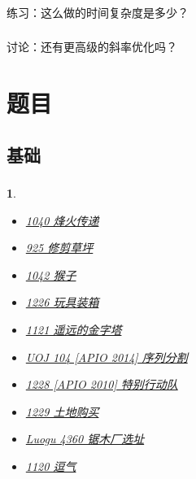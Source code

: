 \documentclass[9pt, UTF8]{beamer} %
\newcommand \fts {\frametitle{\insertsubsection}}
\newtheorem*{bbox}{}
\begin{document}
	\begin{frame}
		\fts

		练习：这么做的时间复杂度是多少？
	\end{frame}

	\begin{frame}
		\fts

		讨论：还有更高级的斜率优化吗？
	\end{frame}

	\section{题目}

	\subsection{基础}

	\begin{frame}
		\fts

		\begin{bbox}
			\begin{itemize}

				\item \href {http://219.153.61.2:9000/problem/1040} {1040 烽火传递}

				\item \href {http://219.153.61.2:9000/problem/925} {925 修剪草坪}

				\item \href {http://219.153.61.2:9000/problem/1042} {1042 猴子}

				\item \href {http://219.153.61.2:9000/problem/1226} {1226 玩具装箱}

				\item \href {http://219.153.61.2:9000/problem/1121} {1121 遥远的金字塔}

				\item \href {http://uoj.ac/problem/104} {UOJ 104 [APIO 2014] 序列分割}

				\item \href {http://219.153.61.2:9000/problem/1228} {1228 [APIO 2010] 特别行动队}

				\item \href {http://219.153.61.2:9000/problem/1229} {1229 土地购买}

				\item \href {https://www.luogu.org/problemnew/show/P4360} {Luogu 4360 锯木厂选址}

				\item \href {http://219.153.61.2:9000/problem/1120} {1120 逗气}

			\end{itemize}
		\end{bbox}

	\end{frame}
\end{document}
